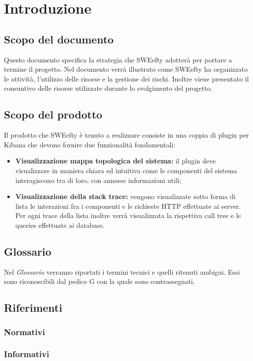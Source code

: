 
\section{Introduzione}
	\subsection{Scopo del documento}
	Questo documento specifica la strategia che SWEefty adotterà per portare a termine il progetto.
	Nel documento verrà illustrato come SWEefty ha organizzato le attività, l'utilizzo delle risorse e la gestione dei rischi.
	Inoltre viene presentato il consuntivo delle risorse utilizzate durante lo svolgimento del progetto.
	
	\subsection{Scopo del prodotto}
	Il prodotto che SWEefty è tenuto a realizzare consiste in una coppia di plugin per Kibana che devono fornire due funzionalità fondamentali:
	\begin{itemize}
		\item \textbf{Visualizzazione mappa topologica del sistema:} il plugin deve visualizzare in maniera chiara ed intuitiva come le componenti del sistema interagiscono tra di loro, con annesse informazioni utili;
		\item \textbf{Visualizzazione della stack trace:} vengono visualizzate sotto forma di lista le interazioni fra i componenti e le richieste HTTP effettuate ai server. Per ogni trace della lista inoltre verrà visualizzata la rispettiva call tree e le queries effettuate ai database.
	\end{itemize}

	\subsection{Glossario}
	Nel \emph{Glossario} verranno riportati i termini tecnici e quelli ritenuti ambigui. Essi sono riconoscibili dal pedice G con la quale sono contrassegnati.
	
	\subsection{Riferimenti}
			\subsubsection{Normativi}
			\subsubsection{Informativi}
